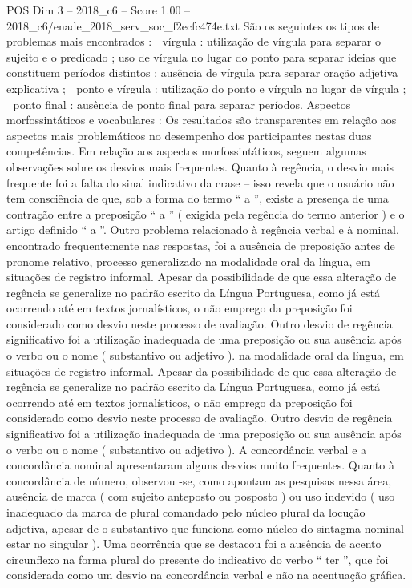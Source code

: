 \begin{textsample}{POS Dim 3 – 2018\_c6 – Score 1.00 – 2018\_c6/enade\_2018\_serv\_soc\_f2ecfc474e.txt}
São os seguintes os tipos de problemas mais encontrados :  vírgula : utilização de vírgula para separar o sujeito e o predicado ; uso de vírgula no lugar do ponto para separar ideias que constituem períodos distintos ; ausência de vírgula para separar oração adjetiva explicativa ;  ponto e vírgula : utilização do ponto e vírgula no lugar de vírgula ;  ponto final : ausência de ponto final para separar períodos.
Aspectos morfossintáticos e vocabulares : Os resultados são transparentes em relação aos aspectos mais problemáticos no desempenho dos participantes nestas duas competências.
Em relação aos aspectos morfossintáticos, seguem algumas observações sobre os desvios mais frequentes.
Quanto à regência, o desvio mais frequente foi a falta do sinal indicativo da crase – isso revela que o usuário não tem consciência de que, sob a forma do termo “ a ”, existe a presença de uma contração entre a preposição “ a ” ( exigida pela regência do termo anterior ) e o artigo definido “ a ”.
Outro problema relacionado à regência verbal e à nominal, encontrado frequentemente nas respostas, foi a ausência de preposição antes de pronome relativo, processo generalizado na modalidade oral da língua, em situações de registro informal.
Apesar da possibilidade de que essa alteração de regência se generalize no padrão escrito da Língua Portuguesa, como já está ocorrendo até em textos jornalísticos, o não emprego da preposição foi considerado como desvio neste processo de avaliação.
Outro desvio de regência significativo foi a utilização inadequada de uma preposição ou sua ausência após o verbo ou o nome ( substantivo ou adjetivo ). na modalidade oral da língua, em situações de registro informal.
Apesar da possibilidade de que essa alteração de regência se generalize no padrão escrito da Língua Portuguesa, como já está ocorrendo até em textos jornalísticos, o não emprego da preposição foi considerado como desvio neste processo de avaliação.
Outro desvio de regência significativo foi a utilização inadequada de uma preposição ou sua ausência após o verbo ou o nome ( substantivo ou adjetivo ).
A concordância verbal e a concordância nominal apresentaram alguns desvios muito frequentes.
Quanto à concordância de número, observou -se, como apontam as pesquisas nessa área, ausência de marca ( com sujeito anteposto ou posposto ) ou uso indevido ( uso inadequado da marca de plural comandado pelo núcleo plural da locução adjetiva, apesar de o substantivo que funciona como núcleo do sintagma nominal estar no singular ).
Uma ocorrência que se destacou foi a ausência de acento circunflexo na forma plural do presente do indicativo do verbo “ ter ”, que foi considerada como um desvio na concordância verbal e não na acentuação gráfica.

\end{textsample}
